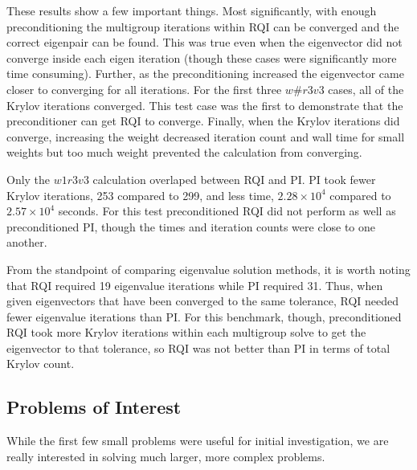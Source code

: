 \documentclass[preprint,12pt]{elsarticle}
\begin{document}
These results show a few important things. Most significantly, with enough preconditioning the multigroup iterations within RQI can be converged and the correct eigenpair can be found. This was true even when the eigenvector did not converge inside each eigen iteration (though these cases were significantly more time consuming). Further, as the preconditioning increased the eigenvector came closer to converging for all iterations. For the first three $w\#r3v3$ cases, all of the Krylov iterations converged. This test case was the first to demonstrate that the preconditioner can get RQI to converge. Finally, when the Krylov iterations did converge, increasing the weight decreased iteration count and wall time for small weights but too much weight prevented the calculation from converging.

Only the $w1r3v3$ calculation overlaped between RQI and PI. PI took fewer Krylov iterations, 253 compared to 299, and less time, $2.28 \times 10^{4}$ compared to $2.57 \times 10^{4}$ seconds. For this test preconditioned RQI did not perform as well as preconditioned PI, though the times and iteration counts were close to one another. 

From the standpoint of comparing eigenvalue solution methods, it is worth noting that RQI required 19 eigenvalue iterations while PI required 31. Thus, when given eigenvectors that have been converged to the same tolerance, RQI needed fewer eigenvalue iterations than PI. For this benchmark, though, preconditioned RQI took more Krylov iterations within each multigroup solve to get the eigenvector to that tolerance, so RQI was not better than PI in terms of total Krylov count.
%

\subsection{Problems of Interest}
While the first few small problems were useful for initial investigation, we are really interested in solving much larger, more complex problems. 
\end{document}
